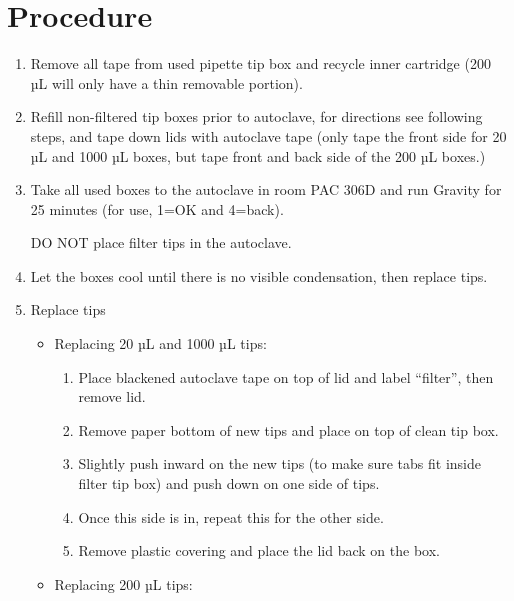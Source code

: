 \documentclass[
  letterpaper,
  DIV=11,
  numbers=noendperiod]{scrreprt}
\providecommand{\tightlist}{%
  \setlength{\itemsep}{0pt}\setlength{\parskip}{0pt}}\usepackage{longtable,booktabs,array}
\begin{document}
\hypertarget{procedure-8}{%
\section{Procedure}\label{procedure-8}}

\begin{enumerate}
\def\labelenumi{\arabic{enumi}.}
\item
  Remove all tape from used pipette tip box and recycle inner cartridge
  (200 µL will only have a thin removable portion).
\item
  Refill non-filtered tip boxes prior to autoclave, for directions see
  following steps, and tape down lids with autoclave tape (only tape the
  front side for 20 µL and 1000 µL boxes, but tape front and back side
  of the 200 µL boxes.)
\item
  Take all used boxes to the autoclave in room PAC 306D and run Gravity
  for 25 minutes (for use, 1=OK and 4=back).

  \begin{tcolorbox}[enhanced jigsaw, rightrule=.15mm, title=\textcolor{quarto-callout-important-color}{\faExclamation}\hspace{0.5em}{IMPORTANT}, titlerule=0mm, opacitybacktitle=0.6, toprule=.15mm, bottomrule=.15mm, opacityback=0, left=2mm, colframe=quarto-callout-important-color-frame, breakable, coltitle=black, colback=white, colbacktitle=quarto-callout-important-color!10!white, bottomtitle=1mm, leftrule=.75mm, toptitle=1mm, arc=.35mm]

  DO NOT place filter tips in the autoclave.

  \end{tcolorbox}
\item
  Let the boxes cool until there is no visible condensation, then
  replace tips.
\item
  Replace tips

  \begin{itemize}
  \item
    Replacing 20 µL and 1000 µL tips:

    \begin{enumerate}
    \def\labelenumii{\arabic{enumii}.}
    \tightlist
    \item
      Place blackened autoclave tape on top of lid and label ``filter'',
      then remove lid.
    \item
      Remove paper bottom of new tips and place on top of clean tip box.
    \item
      Slightly push inward on the new tips (to make sure tabs fit inside
      filter tip box) and push down on one side of tips.
    \item
      Once this side is in, repeat this for the other side.
    \item
      Remove plastic covering and place the lid back on the box.
    \end{enumerate}
  \item
    Replacing 200 µL tips:


\end{itemize}
\end{enumerate}
\end{document}
